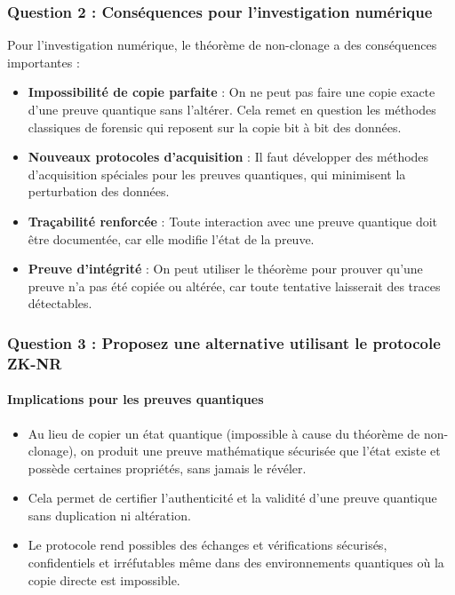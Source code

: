 \documentclass[12pt, a4paper]{article}
\begin{document}
		\subsubsection*{Question 2 : Conséquences pour l'investigation numérique}
		
		Pour l'investigation numérique, le théorème de non-clonage a des conséquences importantes :
		
		\begin{itemize}
			\item \textbf{Impossibilité de copie parfaite} : On ne peut pas faire une copie exacte d'une preuve quantique sans l'altérer. Cela remet en question les méthodes classiques de forensic qui reposent sur la copie bit à bit des données.
			\item \textbf{Nouveaux protocoles d'acquisition} : Il faut développer des méthodes d'acquisition spéciales pour les preuves quantiques, qui minimisent la perturbation des données.
			\item \textbf{Traçabilité renforcée} : Toute interaction avec une preuve quantique doit être documentée, car elle modifie l'état de la preuve.
			\item \textbf{Preuve d'intégrité} : On peut utiliser le théorème pour prouver qu'une preuve n'a pas été copiée ou altérée, car toute tentative laisserait des traces détectables.
		\end{itemize}
		
	
		\subsubsection*{Question 3 : Proposez une alternative utilisant le protocole ZK-NR}
		
		\paragraph{Implications pour les preuves quantiques}
		\begin{itemize}
			\item Au lieu de copier un état quantique (impossible à cause du théorème de non-clonage), on produit une preuve mathématique sécurisée que l'état existe et possède certaines propriétés, sans jamais le révéler.
			\item Cela permet de certifier l'authenticité et la validité d'une preuve quantique sans duplication ni altération.
			\item Le protocole rend possibles des échanges et vérifications sécurisés, confidentiels et irréfutables même dans des environnements quantiques où la copie directe est impossible.
		\end{itemize}
		
\end{document}

